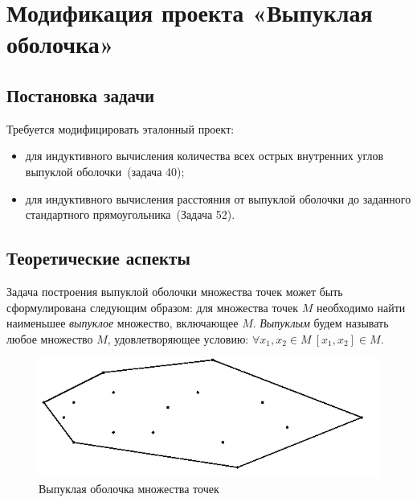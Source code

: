 \section{Модификация проекта «Выпуклая оболочка»}

\subsection{Постановка задачи}
Требуется модифицировать эталонный проект:
\begin{itemize}
\item для индуктивного вычисления количества всех острых внутренних углов выпуклой
оболочки~(задача 40);
\item для индуктивного вычисления расстояния от выпуклой оболочки до заданного
стандартного прямоугольника~(Задача 52).
\end{itemize}

\subsection{Теоретические аспекты}

Задача построения выпуклой оболочки множества точек может быть сформулирована следующим
образом: для множества точек $M$ необходимо найти наименьшее \emph{выпуклое} множество,
включающее $M$. \emph{Выпуклым} будем называть любое множество $M$, удовлетворяющее условию:
$ \forall x_1, x_2 \in M\ [x_1,x_2]\in M.$

\begin{figure}[ht!]
\begin{center}
\includegraphics[scale=0.6]{images/conv_a_1}
\end{center}
\vspace*{-8mm}
\caption{Выпуклая оболочка множества точек}\label{fig:convex_hull}
\end{figure}

